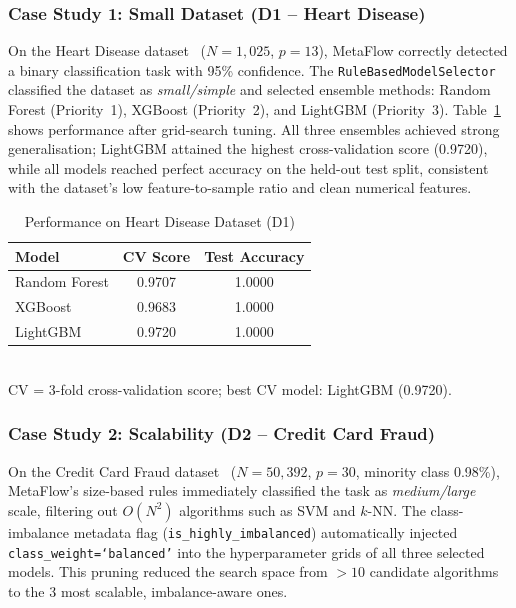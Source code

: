 \documentclass[conference]{llncs}
\begin{document}
   \subsubsection{Case Study 1: Small Dataset (D1 -- Heart Disease)}   %
   On the Heart Disease dataset~\cite{janosi1988heart} ($N=1{,}025$, $p=13$), MetaFlow correctly detected a binary classification task with 95\% confidence. The \texttt{RuleBasedModelSelector} classified the dataset as \emph{small/simple} and selected ensemble methods: Random Forest (Priority~1), XGBoost (Priority~2), and LightGBM (Priority~3).
   Table~\ref{tab:d1_results} shows performance after grid-search tuning. All three ensembles achieved strong generalisation; LightGBM attained the highest cross-validation score (0.9720), while all models reached perfect accuracy on the held-out test split, consistent with the dataset's low feature-to-sample ratio and clean numerical features.

   \begin{table}[htbp]
   \centering
   \caption{Performance on Heart Disease Dataset (D1)}
   \label{tab:d1_results}
   \small
   \begin{tabular}{lcc}
   \hline
   \textbf{Model} & \textbf{CV Score} & \textbf{Test Accuracy} \\
   \hline
   Random Forest & 0.9707 & 1.0000 \\
   XGBoost       & 0.9683 & 1.0000 \\
   LightGBM      & 0.9720 & 1.0000 \\
   \hline
   \end{tabular}
    \vspace{1mm}
    \\{\scriptsize CV = 3-fold cross-validation score; best CV model: LightGBM (0.9720).}
    \end{table}

   \subsubsection{Case Study 2: Scalability (D2 -- Credit Card Fraud)}  %
   On the Credit Card Fraud dataset~\cite{dalpozzolo2015fraud} ($N=50{,}392$, $p=30$, minority class 0.98\%), MetaFlow's size-based rules immediately classified the task as \emph{medium/large} scale, filtering out $O(N^2)$ algorithms such as SVM and $k$-NN. The class-imbalance metadata flag (\texttt{is\_highly\_imbalanced}) automatically injected \texttt{class\_weight=`balanced'} into the hyperparameter grids of all three selected models. This pruning reduced the search space from $>10$ candidate algorithms to the 3 most scalable, imbalance-aware ones.
\end{document}
